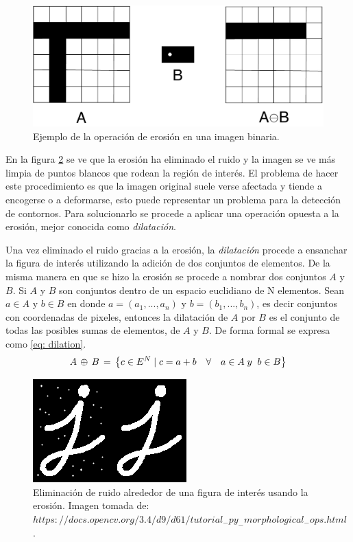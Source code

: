 \begin{figure}
\centering 
\includegraphics[scale=0.7]{images/erosion_diagram.pdf}
\caption{Ejemplo de la operación de erosión en una imagen binaria.}
\label{fig:erosion_diagram}
\end{figure}

En la figura \ref{fig:erosion_example} se ve que la erosión ha eliminado el ruido y la imagen se ve más limpia de puntos blancos que rodean la región de interés. El problema de hacer este procedimiento es que la imagen original suele verse afectada y tiende a encogerse o a deformarse, esto puede representar un problema para la detección de contornos. Para solucionarlo se procede a aplicar una operación opuesta a la erosión, mejor conocida como \textit{dilatación}.

Una vez eliminado el ruido gracias a la erosión, la \textit{dilatación} procede a ensanchar la figura de interés utilizando la adición de dos conjuntos de elementos. De la misma manera en que se hizo la erosión se procede a nombrar dos conjuntos $A$ y $B$. Si $A$ y $B$ son conjuntos dentro de un espacio euclidiano de N elementos. Sean $a \in A$ y $b \in B$ en donde $a=(a_1, ... ,a_n)$ y $b=(b_1,...,b_n)$, es decir conjuntos con coordenadas de pixeles, entonces la dilatación de $A$ por $B$ es el conjunto de todas las posibles sumas de elementos, de $A$ y $B$. De forma formal se expresa como \ref{eq: dilation}.
\begin{equation}
A\thinspace\oplus\thinspace B\thinspace=\thinspace \left \{ c \in E^N  \mid c=a+b \quad\forall \quad a \in A \; y\; \; b \in B\right \}
\label{eq: dilation}
\end{equation}


\begin{figure}
\centering
\includegraphics[scale=1]{images/erosion_example.png}
\caption{Eliminación de ruido alrededor de una figura de interés usando la erosión.  Imagen tomada de: $https://docs.opencv.org/3.4/d9/d61/tutorial_-py_-morphological_-ops.html$ .}
\label{fig:erosion_example}
\end{figure}

